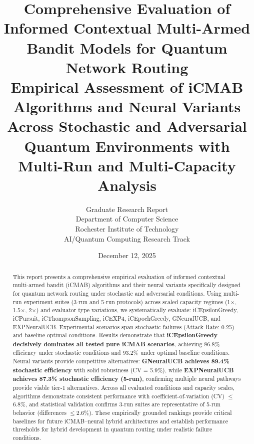 \documentclass[12pt,a4paper]{article}
\title{\textbf{Comprehensive Evaluation of Informed Contextual Multi-Armed Bandit Models for Quantum Network Routing}\\
\large{Empirical Assessment of iCMAB Algorithms and Neural Variants Across Stochastic and Adversarial Quantum Environments with Multi-Run and Multi-Capacity Analysis}}
\author{Graduate Research Report\\
Department of Computer Science\\
Rochester Institute of Technology\\
AI/Quantum Computing Research Track}
\date{December 12, 2025}
\newcommand{\primarytext}[1]{\textcolor{primaryblue}{\textbf{#1}}}
\newcommand{\legacy}[1]{\textcolor{legacycolor}{\textbf{#1}}}
\newcommand{\neural}[1]{\textcolor{neuralcolor}{\textbf{#1}}}
\begin{document}
\maketitle

\begin{abstract}
This report presents a comprehensive empirical evaluation of informed contextual multi-armed bandit (iCMAB) algorithms and their neural variants specifically designed for quantum network routing under stochastic and adversarial conditions. Using multi-run experiment suites (3-run and 5-run protocols) across scaled capacity regimes (1$\times$, 1.5$\times$, 2$\times$) and evaluator type variations, we systematically evaluate: iCEpsilonGreedy, iCPursuit, iCThompsonSampling, iCEXP4, iCEpochGreedy, GNeuralUCB, and EXPNeuralUCB. Experimental scenarios span stochastic failures (Attack Rate: 0.25) and baseline optimal conditions. Results demonstrate that \primarytext{iCEpsilonGreedy decisively dominates all tested pure iCMAB scenarios}, achieving 86.8\% efficiency under stochastic conditions and 93.2\% under optimal baseline conditions. Neural variants provide competitive alternatives: \neural{GNeuralUCB achieves 89.4\% stochastic efficiency} with solid robustness (CV = 5.9\%), while \legacy{EXPNeuralUCB achieves 87.3\% stochastic efficiency (5-run)}, confirming multiple neural pathways provide viable tier-1 alternatives. Across all evaluated conditions and capacity scales, algorithms demonstrate consistent performance with coefficient-of-variation (CV) $\leq$6.8\%, and statistical validation confirms 3-run suites are representative of 5-run behavior (differences $\leq$2.6\%). These empirically grounded rankings provide critical baselines for future iCMAB--neural hybrid architectures and establish performance thresholds for hybrid development in quantum routing under realistic failure conditions.
\end{abstract}

\newpage
\tableofcontents

\newpage
\end{document}
